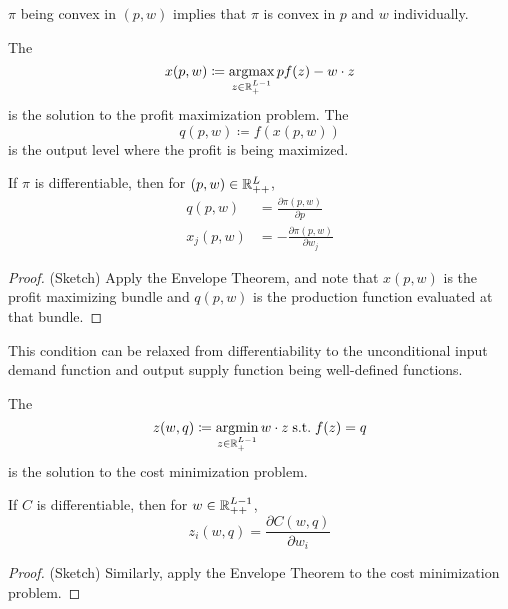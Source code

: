 \documentclass[12pt]{article}
\begin{document}
\begin{remark}
	$\pi$ being convex in $(p,w)$ implies that $\pi$ is convex in $p$ and $w$ individually.
\end{remark}

\begin{definition}
	The 
	\[
	x(p,w) \coloneqq \mathop{\rm argmax}_{z \in \mathbb{R}^{L-1}_+} pf(z) - w\cdot z
	\]
	is the solution to the profit maximization problem. The 
	\[
	q(p,w) \coloneqq f(x(p,w))
	\]
	is the output level where the profit is being maximized.
\end{definition}

\begin{proposition}\label{prop:hotelling}
	 If $\pi$ is differentiable, then for $(p,w) \in \mathbb{R}^L_{++}$,
	\begin{align*}
		q(p,w) &= \frac{\partial \pi(p,w)}{\partial p} \\
		x_j(p,w) &= -\frac{\partial \pi(p,w)}{\partial w_j}
	\end{align*}
\end{proposition}
\begin{proof}
	(Sketch) Apply the Envelope Theorem, and note that $x(p,w)$ is the profit maximizing bundle and $q(p,w)$ is the production function evaluated at that bundle.
\end{proof}

\begin{remark}
	This condition can be relaxed from differentiability to the unconditional input demand function and output supply function being well-defined functions.
\end{remark}

\begin{definition}
	The  
	\[
	z(w,q) \coloneqq \mathop{\rm argmin}_{z \in \mathbb{R}^{L-1}_+} w \cdot z \;\text{s.t.}\; f(z) = q
	\]
	is the solution to the cost minimization problem.
\end{definition}

\begin{proposition}
	 If $C$ is differentiable, then for $w \in \mathbb{R}^{L-1}_{++}$,
	\[
	z_i(w,q) = \frac{\partial C(w,q)}{\partial w_i}
	\]
\end{proposition}
\begin{proof}
	(Sketch) Similarly, apply the Envelope Theorem to the cost minimization problem.
\end{proof}
\end{document}
